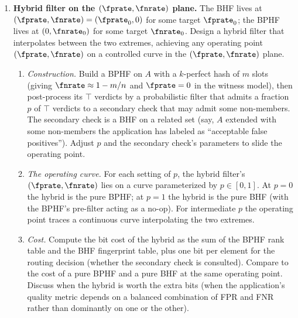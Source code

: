 \begin{enumerate}
\item \exstarstarstar
\label{ex:ch15-11}
\textbf{Hybrid filter on the $(\fprate, \fnrate)$ plane.}
The BHF lives at $(\fprate, \fnrate) = (\fprate_0, 0)$ for some
target $\fprate_0$; the BPHF lives at $(0, \fnrate_0)$ for some
target $\fnrate_0$. Design a hybrid filter that interpolates between
the two extremes, achieving any operating point
$(\fprate, \fnrate)$ on a controlled curve in the $(\fprate,
\fnrate)$ plane.
\begin{enumerate}
  \item[(a)] \emph{Construction.} Build a BPHF on $A$ with a
    $k$-perfect hash of $m$ slots (giving $\fnrate \approx 1 - m/n$
    and $\fprate = 0$ in the witness model), then post-process its
    $\top$ verdicts by a probabilistic filter that admits a fraction
    $p$ of $\top$ verdicts to a secondary check that may admit some
    non-members. The secondary check is a BHF on a related set
    (say, $A$ extended with some non-members the application
    has labeled as ``acceptable false positives''). Adjust $p$ and
    the secondary check's parameters to slide the operating
    point.
  \item[(b)] \emph{The operating curve.} For each setting of $p$,
    the hybrid filter's $(\fprate, \fnrate)$ lies on a curve
    parameterized by $p \in [0, 1]$. At $p = 0$ the hybrid is the
    pure BPHF; at $p = 1$ the hybrid is the pure BHF (with the
    BPHF's pre-filter acting as a no-op). For intermediate $p$ the
    operating point traces a continuous curve interpolating the
    two extremes.
  \item[(c)] \emph{Cost.} Compute the bit cost of the hybrid as the
    sum of the BPHF rank table and the BHF fingerprint table, plus
    one bit per element for the routing decision (whether the
    secondary check is consulted). Compare to the cost of a pure
    BPHF and a pure BHF at the same operating point. Discuss when
    the hybrid is worth the extra bits (when the application's
    quality metric depends on a balanced combination of FPR and
    FNR rather than dominantly on one or the other).
\end{enumerate}

\end{enumerate}
